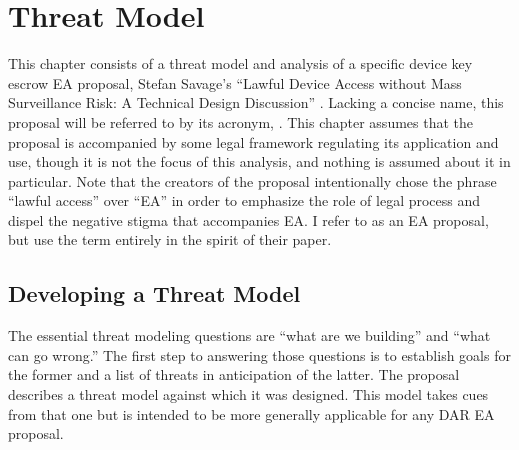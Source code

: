 \chapter{Threat Model}
\label{chap-threatmodel}

This chapter consists of a threat model and analysis of a specific device key escrow \ac{EA} proposal, Stefan Savage's
``Lawful Device Access without Mass Surveillance Risk: A Technical Design Discussion'' \cite{savage_lawful_2018}.
Lacking a concise name, this proposal will be referred to by its acronym, \ldawmsR. This chapter assumes that the
proposal is accompanied by some legal framework regulating its application and use, though it is not the focus of this
analysis, and nothing is assumed about it in particular. Note that the creators of the proposal intentionally chose the
phrase ``lawful access'' over ``\acl{EA}'' in order to emphasize the role of legal process and dispel the negative
stigma that accompanies \ac{EA}. I refer to \ldawmsr as an \ac{EA} proposal, but use the term entirely in the spirit of
their paper.



\section{Developing a Threat Model}

The essential threat modeling questions are ``what are we building'' and ``what can go wrong.'' The first step to
answering those questions is to establish goals for the former and a list of threats in anticipation of the latter. The
\ldawmsr proposal describes a threat model against which it was designed. This model takes cues from that one but is
intended to be more generally applicable for any \ac{DAR} \ac{EA} proposal.

\newcommand{\modelstart}[0]{\begin{itemize}}
\newcommand{\modelitem}[2]{ %
    \item \textbf{#1} \nopagebreak

    \vspace{0.5\baselineskip} \parbox{\linewidth}{#2} \vspace{0.5\baselineskip}
}
\newcommand{\modelend}{\end{itemize}}


